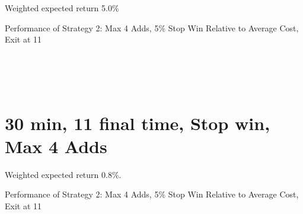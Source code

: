 \documentclass{article}
\begin{document}
Weighted expected return 5.0\%

\begin{table}
\caption{Performance of Strategy 2: Max 4 Adds, 5\% Stop Win Relative to Average Cost, Exit at 11}
\\[2ex]


\\[2ex]


\\[2ex]

\label{tab_strat_3}
\end{table}

\section{30 min, 11 final time, Stop win, Max 4 Adds }

Weighted expected return 0.8\%.

\begin{table}
\caption{Performance of Strategy 2: Max 4 Adds, 5\% Stop Win Relative to Average Cost, Exit at 11}
\\[2ex]


\\[2ex]


\\[2ex]

\label{tab_strat_4}
\end{table}
\end{document}
